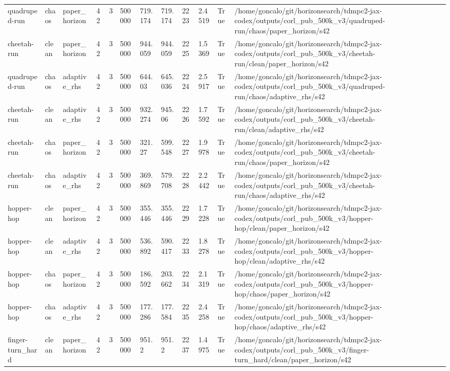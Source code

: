 \begin{tabular}{llllllllllll}
quadruped-run & chaos & paper\_horizon & 42 & 3 & 500000 & 719.174 & 719.174 & 2223 & 2.4519 & True & /home/goncalo/git/horizonsearch/tdmpc2-jax-codex/outputs/corl\_pub\_500k\_v3/quadruped-run/chaos/paper\_horizon/s42 \\
cheetah-run & clean & paper\_horizon & 42 & 3 & 500000 & 944.059 & 944.059 & 2225 & 1.5369 & True & /home/goncalo/git/horizonsearch/tdmpc2-jax-codex/outputs/corl\_pub\_500k\_v3/cheetah-run/clean/paper\_horizon/s42 \\
quadruped-run & chaos & adaptive\_rhs & 42 & 3 & 500000 & 644.03 & 645.036 & 2224 & 2.5917 & True & /home/goncalo/git/horizonsearch/tdmpc2-jax-codex/outputs/corl\_pub\_500k\_v3/quadruped-run/chaos/adaptive\_rhs/s42 \\
cheetah-run & clean & adaptive\_rhs & 42 & 3 & 500000 & 932.274 & 945.06 & 2226 & 1.7592 & True & /home/goncalo/git/horizonsearch/tdmpc2-jax-codex/outputs/corl\_pub\_500k\_v3/cheetah-run/clean/adaptive\_rhs/s42 \\
cheetah-run & chaos & paper\_horizon & 42 & 3 & 500000 & 321.27 & 599.548 & 2227 & 1.9978 & True & /home/goncalo/git/horizonsearch/tdmpc2-jax-codex/outputs/corl\_pub\_500k\_v3/cheetah-run/chaos/paper\_horizon/s42 \\
cheetah-run & chaos & adaptive\_rhs & 42 & 3 & 500000 & 369.869 & 579.708 & 2228 & 2.2442 & True & /home/goncalo/git/horizonsearch/tdmpc2-jax-codex/outputs/corl\_pub\_500k\_v3/cheetah-run/chaos/adaptive\_rhs/s42 \\
hopper-hop & clean & paper\_horizon & 42 & 3 & 500000 & 355.446 & 355.446 & 2229 & 1.7228 & True & /home/goncalo/git/horizonsearch/tdmpc2-jax-codex/outputs/corl\_pub\_500k\_v3/hopper-hop/clean/paper\_horizon/s42 \\
hopper-hop & clean & adaptive\_rhs & 42 & 3 & 500000 & 536.892 & 590.417 & 2233 & 1.8278 & True & /home/goncalo/git/horizonsearch/tdmpc2-jax-codex/outputs/corl\_pub\_500k\_v3/hopper-hop/clean/adaptive\_rhs/s42 \\
hopper-hop & chaos & paper\_horizon & 42 & 3 & 500000 & 186.592 & 203.662 & 2234 & 2.1319 & True & /home/goncalo/git/horizonsearch/tdmpc2-jax-codex/outputs/corl\_pub\_500k\_v3/hopper-hop/chaos/paper\_horizon/s42 \\
hopper-hop & chaos & adaptive\_rhs & 42 & 3 & 500000 & 177.286 & 177.584 & 2235 & 2.4258 & True & /home/goncalo/git/horizonsearch/tdmpc2-jax-codex/outputs/corl\_pub\_500k\_v3/hopper-hop/chaos/adaptive\_rhs/s42 \\
finger-turn\_hard & clean & paper\_horizon & 42 & 3 & 500000 & 951.2 & 951.2 & 2237 & 1.4975 & True & /home/goncalo/git/horizonsearch/tdmpc2-jax-codex/outputs/corl\_pub\_500k\_v3/finger-turn\_hard/clean/paper\_horizon/s42 \\

\end{tabular}
